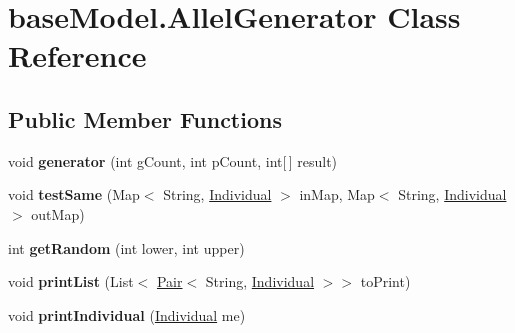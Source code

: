 \hypertarget{classbase_model_1_1_allel_generator}{}\section{base\+Model.\+Allel\+Generator Class Reference}
\label{classbase_model_1_1_allel_generator}
\subsection*{Public Member Functions}
\begin{DoxyCompactItemize}
\item 
\hypertarget{classbase_model_1_1_allel_generator_a56f005589d3704ff6c9b36c8807a9ec5}{}void {\bfseries generator} (int g\+Count, int p\+Count, int\mbox{[}$\,$\mbox{]} result)\label{classbase_model_1_1_allel_generator_a56f005589d3704ff6c9b36c8807a9ec5}

\item 
\hypertarget{classbase_model_1_1_allel_generator_a2bdc44a34237e1373448902a5e718d3e}{}void {\bfseries test\+Same} (Map$<$ String, \hyperlink{classbase_model_1_1_individual}{Individual} $>$ in\+Map, Map$<$ String, \hyperlink{classbase_model_1_1_individual}{Individual} $>$ out\+Map)\label{classbase_model_1_1_allel_generator_a2bdc44a34237e1373448902a5e718d3e}

\item 
\hypertarget{classbase_model_1_1_allel_generator_aab0d922125fcdcba609d77e7574b3d02}{}int {\bfseries get\+Random} (int lower, int upper)\label{classbase_model_1_1_allel_generator_aab0d922125fcdcba609d77e7574b3d02}

\item 
\hypertarget{classbase_model_1_1_allel_generator_a93180e9ef27d9d920e9be10e21802ab3}{}void {\bfseries print\+List} (List$<$ \hyperlink{classbase_model_1_1_pair}{Pair}$<$ String, \hyperlink{classbase_model_1_1_individual}{Individual} $>$$>$ to\+Print)\label{classbase_model_1_1_allel_generator_a93180e9ef27d9d920e9be10e21802ab3}

\item 
\hypertarget{classbase_model_1_1_allel_generator_a1dff372364529c7b2eedb99634226ed5}{}void {\bfseries print\+Individual} (\hyperlink{classbase_model_1_1_individual}{Individual} me)\label{classbase_model_1_1_allel_generator_a1dff372364529c7b2eedb99634226ed5}

\end{DoxyCompactItemize}

